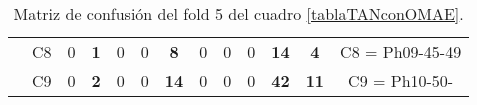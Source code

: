 \begin{table}[H]
{\begin{tabular}{|ccrrrrrrrrrrc|}
\multicolumn{1}{|c|}{}                                      & \multicolumn{1}{c|}{C8} & \multicolumn{1}{c|}{0}          & \multicolumn{1}{c|}{\textbf{1}} & \multicolumn{1}{c|}{0}  & \multicolumn{1}{c|}{0}  & \multicolumn{1}{c|}{\textbf{8}}  & \multicolumn{1}{c|}{0}  & \multicolumn{1}{c|}{0}  & \multicolumn{1}{c|}{0}  & \multicolumn{1}{c|}{\textbf{14}} & \multicolumn{1}{c|}{\textbf{4}}  & C8 = Ph09-45-49   \\ \cline{2-13}
\multicolumn{1}{|c|}{}                                      & \multicolumn{1}{c|}{C9} & \multicolumn{1}{c|}{0}          & \multicolumn{1}{c|}{\textbf{2}} & \multicolumn{1}{c|}{0}  & \multicolumn{1}{c|}{0}  & \multicolumn{1}{c|}{\textbf{14}} & \multicolumn{1}{c|}{0}  & \multicolumn{1}{c|}{0}  & \multicolumn{1}{c|}{0}  & \multicolumn{1}{c|}{\textbf{42}} & \multicolumn{1}{c|}{\textbf{11}} & C9 = Ph10-50-     \\ \hline
\end{tabular}%
}
\caption{Matriz de confusión del fold 5 del cuadro \ref{tablaTANconOMAE}.}
\end{table}


